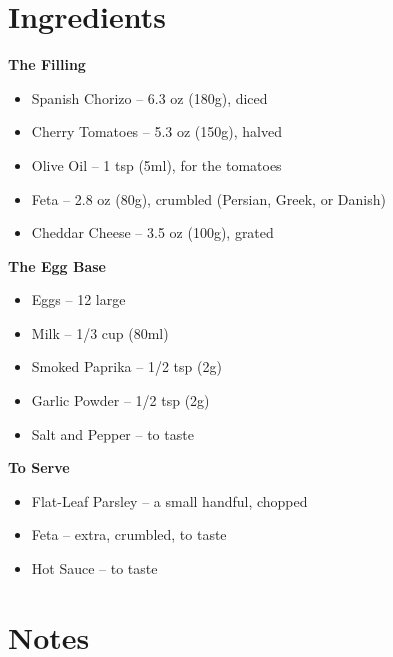 




\section*{Ingredients}

\textbf{The Filling}
\begin{itemize}[itemsep=0.1em, label={\raisebox{-0.1ex}{\large\textbullet}}]
      \item[\cut] Spanish Chorizo – 6.3 oz (180g), diced
      \item[\cut] Cherry Tomatoes – 5.3 oz (150g), halved
      \item[\measure] Olive Oil – 1 tsp (5ml), for the tomatoes
      \item Feta – 2.8 oz (80g), crumbled (Persian, Greek, or Danish)
      \item[\cut] Cheddar Cheese – 3.5 oz (100g), grated
\end{itemize}

\textbf{The Egg Base}
\begin{itemize}[itemsep=0.1em, label={\raisebox{-0.1ex}{\large\textbullet}}]
      \item Eggs – 12 large
      \item[\measure] Milk – 1/3 cup (80ml)
      \item[\measure] Smoked Paprika – 1/2 tsp (2g)
      \item[\measure] Garlic Powder – 1/2 tsp (2g)
      \item Salt and Pepper – to taste
\end{itemize}

\textbf{To Serve}
\begin{itemize}[itemsep=0.1em, label={\raisebox{-0.1ex}{\large\textbullet}}]
      \item[\cut] Flat-Leaf Parsley – a small handful, chopped
      \item Feta – extra, crumbled, to taste
      \item Hot Sauce – to taste
\end{itemize}

\section*{Notes}

